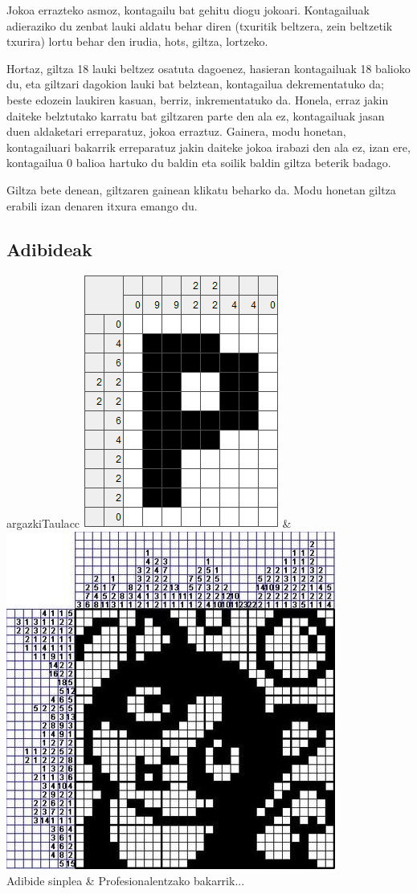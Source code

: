\documentclass[dvipsnames]{AritzhClass}
\begin{document}
Jokoa errazteko asmoz, kontagailu bat gehitu diogu jokoari. Kontagailuak adieraziko du zenbat lauki aldatu behar diren (txuritik beltzera, zein beltzetik txurira) lortu behar den irudia, hots, giltza, lortzeko.

Hortaz, giltza 18 lauki beltzez osatuta dagoenez, hasieran kontagailuak 18 balioko du, eta giltzari dagokion lauki bat belztean, kontagailua dekrementatuko da; beste edozein laukiren kasuan, berriz, inkrementatuko da. Honela, erraz jakin daiteke belztutako karratu bat giltzaren parte den ala ez, kontagailuak jasan duen aldaketari erreparatuz, jokoa erraztuz. Gainera, modu honetan, kontagailuari bakarrik erreparatuz jakin daiteke jokoa irabazi den ala ez, izan ere, kontagailua 0 balioa hartuko du baldin eta soilik baldin giltza beterik badago.

Giltza bete denean, giltzaren gainean klikatu beharko da. Modu honetan giltza erabili izan denaren itxura emango du. 

\subsection{Adibideak}

\begin{taula}{}{argazkiTaula}{cc}
\includegraphics[scale=0.75]{nonograma1} & \includegraphics[scale=0.75]{nonograma2} \\
Adibide sinplea & Profesionalentzako bakarrik...
\end{taula}
\end{document}
